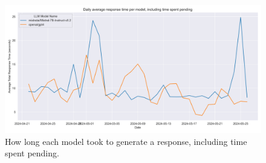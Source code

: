 \begin{figure}[H]
    \centering
    \includegraphics[width=\textwidth]{results/plots/assets/performance-05-daily-average-response-time-per-model-including-pending-time.png}
    \caption{How long each model took to generate a response, including time spent pending.}
    \label{fig:performance_04_daily_average_response_time_including_pending_time}
\end{figure}